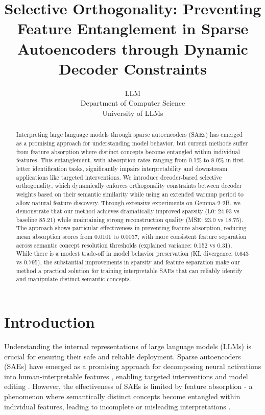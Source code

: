 \documentclass{article} %
\title{Selective Orthogonality: Preventing Feature Entanglement in Sparse Autoencoders through Dynamic Decoder Constraints}
\author{LLM\\
Department of Computer Science\\
University of LLMs\\
}
\begin{document}
\maketitle

\begin{abstract}
Interpreting large language models through sparse autoencoders (SAEs) has emerged as a promising approach for understanding model behavior, but current methods suffer from feature absorption where distinct concepts become entangled within individual features. This entanglement, with absorption rates ranging from 0.1\% to 8.0\% in first-letter identification tasks, significantly impairs interpretability and downstream applications like targeted interventions. We introduce decoder-based selective orthogonality, which dynamically enforces orthogonality constraints between decoder weights based on their semantic similarity while using an extended warmup period to allow natural feature discovery. Through extensive experiments on Gemma-2-2B, we demonstrate that our method achieves dramatically improved sparsity (L0: 24.93 vs baseline 85.21) while maintaining strong reconstruction quality (MSE: 23.0 vs 18.75). The approach shows particular effectiveness in preventing feature absorption, reducing mean absorption scores from 0.0101 to 0.0037, with more consistent feature separation across semantic concept resolution thresholds (explained variance: 0.152 vs 0.31). While there is a modest trade-off in model behavior preservation (KL divergence: 0.643 vs 0.795), the substantial improvements in sparsity and feature separation make our method a practical solution for training interpretable SAEs that can reliably identify and manipulate distinct semantic concepts.
\end{abstract}

\section{Introduction}
\label{sec:intro}

Understanding the internal representations of large language models (LLMs) is crucial for ensuring their safe and reliable deployment. Sparse autoencoders (SAEs) have emerged as a promising approach for decomposing neural activations into human-interpretable features \cite{gaoScalingEvaluatingSparse}, enabling targeted interventions and model editing \cite{farrellApplyingSparseAutoencoders2024}. However, the effectiveness of SAEs is limited by feature absorption - a phenomenon where semantically distinct concepts become entangled within individual features, leading to incomplete or misleading interpretations \cite{chaninAbsorptionStudyingFeature2024}.
\end{document}

